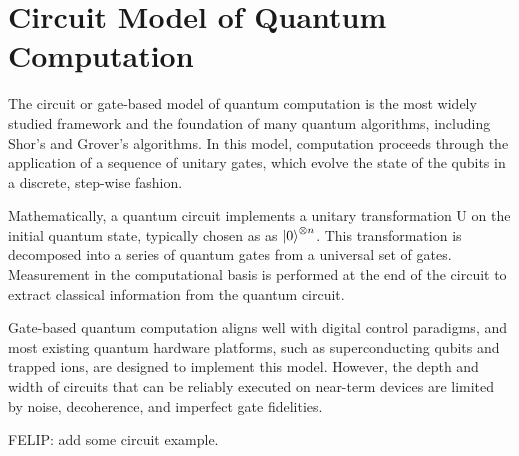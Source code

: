 \section{Circuit Model of Quantum Computation}
\label{Section:GateModelQC}

The circuit or gate-based model of quantum computation is the most widely studied
framework and the foundation of many quantum algorithms, including Shor's and Grover's
algorithms. In this model, computation proceeds through the application of a sequence
of unitary gates, which evolve the state of the qubits in a discrete, step-wise fashion.

Mathematically, a quantum circuit implements a unitary transformation U on the initial
quantum state, typically chosen as as $\ket{0}^{\otimes n}$. This transformation is
decomposed into a series of quantum gates from a universal set of gates. Measurement in
the computational basis is performed at the end of the circuit to extract classical
information from the quantum circuit.

Gate-based quantum computation aligns well with digital control paradigms, and most
existing quantum hardware platforms, such as superconducting qubits and trapped ions, are
designed to implement this model. However, the depth and width of circuits that can be
reliably executed on near-term devices are limited by noise, decoherence, and imperfect
gate fidelities.

{\color{red} FELIP: add some circuit example.}